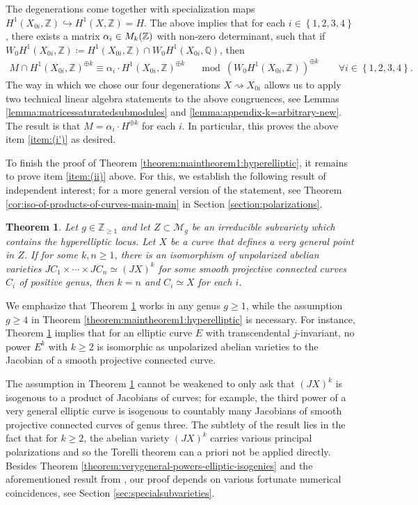 \documentclass[a4paper,11pt,reqno]{amsart}
\numberwithin{equation}{section}
\newtheorem{theorem}{Theorem}[section]
\theoremstyle{plain}
\theoremstyle{definition}
\newcommand{\Z}{\mathbb Z}
\newcommand{\Q}{\mathbb Q}
\let\rm\relax
\newcommand{\rm}[1]{{\mathrm{#1}}}
\renewcommand{\cong}{\simeq}
\newcommand{\set}[1]{\left\{ #1 \right\}}
\begin{document}
The degenerations come together with specialization maps 
 $
 H^1(X_{0i},\Z) \hookrightarrow H^1(X,\Z) = H.
 $
 The above implies that for each $i \in \set{1,2,3,4}$, there exists a matrix $\alpha_i \in \rm{M}_k(\Z)$ with non-zero determinant, such that if $W_0H^1(X_{0i},\Z) \coloneqq H^1(X_{0i},\Z) \cap W_0H^1(X_{0i},\Q)$, then 
 \begin{align*} 
 M \cap H^1(X_{0i},\Z)^{\oplus k} \equiv \alpha_i \cdot H^1(X_{0i},\Z)^{\oplus k} \quad \mod (W_0H^1(X_{0i},\Z))^{\oplus k} \quad \quad \forall i \in \set{1,2,3,4}. 
 \end{align*}
 The way in which we chose our four degenerations $X \rightsquigarrow X_{0i}$ allows us to apply two technical linear algebra statements to the above congruences, see Lemmas \ref{lemma:matricessaturatedsubmodules} and \ref{lemma:appendix-k=arbitrary-new}. 
 The result is that $M = \alpha_i \cdot H^{\oplus k}$ for each $i$. In particular, this proves the above item \ref{item:(i')} as desired. 
  
 To finish the proof of Theorem \ref{theorem:maintheorem1:hyperelliptic}, it remains to prove item \ref{item:(ii)} above. For this, we establish the following result of independent interest; for a more general version of the statement, see Theorem \ref{cor:iso-of-products-of-curves-main-main} in Section \ref{section:polarizations}.  

\begin{theorem}\label{cor:iso-of-products-of-curves-main}
Let $g\in \Z_{\geq 1}$ and let $Z\subset \mathcal M_g$ be an irreducible subvariety which contains the hyperelliptic locus.
Let $X$ be a curve that defines a very general point in $Z$.
If for some $k,n \geq 1$, there is an isomorphism of unpolarized abelian varieties $JC_1 \times \cdots \times JC_n \cong (JX)^k$ for some smooth projective connected curves $C_i$ of positive genus, then $k = n$ and $C_i \cong X$ for each $i$.  
\end{theorem}
 

We emphasize that Theorem \ref{cor:iso-of-products-of-curves-main} works in any genus $g\geq 1$, while the assumption $g\geq 4$ in Theorem \ref{theorem:maintheorem1:hyperelliptic} is necessary. For instance, Theorem \ref{cor:iso-of-products-of-curves-main} implies that for an elliptic curve $E$ with transcendental $j$-invariant, no power $E^k$ with $k \geq 2$ is isomorphic as unpolarized abelian varieties to the Jacobian of a smooth projective connected curve. 

The assumption in Theorem \ref{cor:iso-of-products-of-curves-main} cannot be weakened to only ask that $(JX)^k$ is isogenous to a product of Jacobians of curves; for example, the third power of a very general elliptic curve is isogenous to countably many Jacobians of smooth projective connected curves of genus three.  
The subtlety of the result lies in the fact that for $k \geq 2$, the abelian variety $(JX)^k$ carries various principal polarizations and so the Torelli theorem can a priori not be applied directly. 
Besides Theorem \ref{theorem:verygeneral-powers-elliptic-isogenies} and the aforementioned result  from \cite{kneser-quadratisch}, our proof depends on various fortunate numerical coincidences, see Section \ref{sec:specialsubvarieties}.  
 
\end{document}

